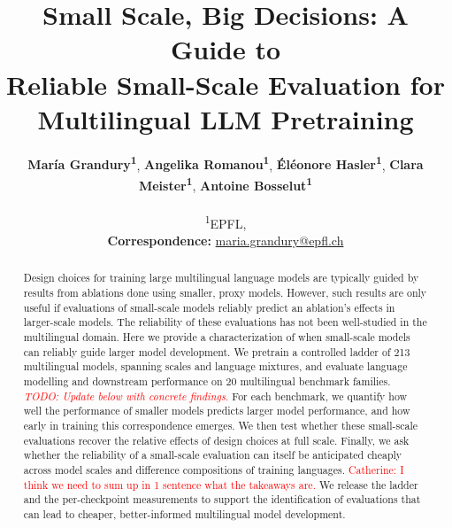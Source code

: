 \documentclass[11pt]{article}
\title{Small Scale, Big Decisions: A Guide to \\ Reliable Small-Scale Evaluation for Multilingual LLM Pretraining}
\author{
  \textbf{María Grandury\textsuperscript{1}},
  \textbf{Angelika Romanou\textsuperscript{1}},
  \textbf{Éléonore Hasler\textsuperscript{1}},
  \textbf{Clara Meister\textsuperscript{1}},
  \textbf{Antoine Bosselut\textsuperscript{1}}
\\
\\
  \textsuperscript{1}EPFL,
\\
  \small{
    \textbf{Correspondence:} \href{mailto:email@domain}{maria.grandury@epfl.ch}
  }
}
\newcommand{\TODO}[1]{\textcolor{red}{\textit{TODO: #1}}}
\newcommand{\nbenchmarks}{20 }
\newcommand{\nmodels}{213 }
\begin{document}
\maketitle
\begin{abstract}
Design choices for training large multilingual language models are typically guided by results from ablations done using smaller, proxy models. However, such results are only useful if evaluations of small-scale models reliably predict an ablation's effects in larger-scale models. The reliability of these evaluations has not been well-studied in the multilingual domain. 
Here we provide a characterization of when small-scale models can reliably guide larger model development. 
We pretrain a controlled ladder of \nmodels multilingual models, spanning scales and language mixtures, %
and evaluate language modelling and downstream performance on \nbenchmarks multilingual benchmark families. %
\TODO{Update below with concrete findings.}
For each benchmark, we quantify how well the performance of smaller models predicts larger model performance, and how early in training this correspondence emerges. 
We then test whether these small-scale evaluations recover the relative effects of design choices at full scale. Finally, we ask whether the reliability of a small-scale evaluation can itself be anticipated cheaply across model scales and difference compositions of training languages.
\textcolor{red}{Catherine: I think we need to sum up in 1 sentence what the takeaways are. }We release the ladder and the per-checkpoint measurements to support the identification of evaluations that can lead to cheaper, better-informed multilingual model development.





\end{abstract}
\end{document}
